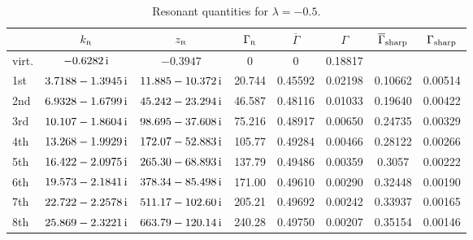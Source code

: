 \documentclass[12pt]{article}
\newcommand{\rmi}{{\rm i}}
\newcommand{\zr}{z_{\text{\tiny R}}}
\newcommand{\gr}{\Gamma _{\text{\tiny R}}}
\newcommand{\kr}{k_{\text{\tiny R}}}
\begin{document}
\begin{table}[H]
\centering
\vspace{6pt}
\begin{tabular}{|l| c| c| c| c | c | c |c |} %
\hline\hline
      & $\kr$ & $\zr$ & $\gr$ & $\overline{\Gamma}$ & $\Gamma$ & 
$\overline{\Gamma}_{\rm sharp}$
& $\Gamma_{\rm sharp}$ \\
\hline

virt. &  $-0.6282 \, \rmi$ & 
$-0.3947$ & 0 & 0 & 0.18817 & &   \\



1st & $3.7188 -1.3945 \, \rmi$ & $11.885 -10.372 \, \rmi$ & 
20.744 & 0.45592 & 0.02198 & 0.10662 & 0.00514  \\

2nd & $6.9328 -1.6799 \, \rmi$ & $45.242 -23.294 \, \rmi$ & 
46.587 & 0.48116 & 0.01033 & 0.19640 & 0.00422 \\

3rd &  $10.107 -1.8604 \, \rmi$ & $98.695 -37.608 \, \rmi$ & 
75.216 & 0.48917 & 0.00650 & 0.24735 & 0.00329  \\

4th & $13.268 -1.9929\, \rmi$ & $172.07 -52.883 \, \rmi$ & 
105.77 & 0.49284 & 0.00466 & 0.28122 & 0.00266  \\

5th & $16.422 -2.0975 \, \rmi$ & $265.30 -68.893 \, \rmi$ & 
137.79 & 0.49486 & 0.00359 & 0.3057 & 0.00222  \\

6th & $19.573 -2.1841 \, \rmi$ & $378.34 -85.498 \, \rmi$ & 
171.00 & 0.49610 & 0.00290 & 0.32448 & 0.00190 \\

7th & $22.722 -2.2578 \, \rmi$ & $511.17 -102.60\, \rmi$ & 
205.21 & 0.49692 & 0.00242 & 0.33937 & 0.00165  \\

8th & $25.869 -2.3221 \, \rmi$ & $663.79 -120.14 \, \rmi$ & 
240.28 & 0.49750 & 0.00207 & 0.35154 & 0.00146  \\




\hline\hline 
\end{tabular}
\caption{Resonant quantities for $\lambda =-0.5$.} 
\label{table:-0.5}
\end{table}
\end{document}
